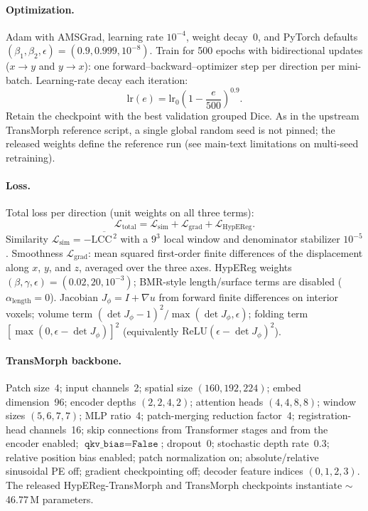 \documentclass[11pt,a4paper]{article}
\begin{document}
\paragraph{Optimization.}
Adam with AMSGrad, learning rate \(10^{-4}\), weight decay~0, and PyTorch defaults \((\beta_1,\beta_2,\epsilon)=(0.9,0.999,10^{-8})\). Train for 500 epochs with bidirectional updates (\(x\rightarrow y\) and \(y\rightarrow x\)): one forward--backward--optimizer step per direction per mini-batch. Learning-rate decay each iteration:
\[
\mathrm{lr}(e)=\mathrm{lr}_0\left(1-\frac{e}{500}\right)^{0.9}.
\]
Retain the checkpoint with the best validation grouped Dice. As in the upstream TransMorph reference script, a single global random seed is not pinned; the released weights define the reference run (see main-text limitations on multi-seed retraining).

\paragraph{Loss.}
Total loss per direction (unit weights on all three terms):
\[
\mathcal{L}_{\mathrm{total}}
=
\mathcal{L}_{\mathrm{sim}}
+
\mathcal{L}_{\mathrm{grad}}
+
\mathcal{L}_{\mathrm{HypEReg}}.
\]
Similarity \(\mathcal{L}_{\mathrm{sim}}=-\overline{\mathrm{LCC}^{\,2}}\) with a \(9^3\) local window and denominator stabilizer \(10^{-5}\). Smoothness \(\mathcal{L}_{\mathrm{grad}}\): mean squared first-order finite differences of the displacement along \(x\), \(y\), and \(z\), averaged over the three axes. HypEReg weights \((\beta,\gamma,\epsilon)=(0.02,20,10^{-3})\); BMR-style length/surface terms are disabled (\(\alpha_{\mathrm{length}}=0\)). Jacobian \(J_\phi=I+\nabla u\) from forward finite differences on interior voxels; volume term \((\det J_\phi-1)^2/\max(\det J_\phi,\epsilon)\); folding term \([\max(0,\epsilon-\det J_\phi)]^2\) (equivalently \(\mathrm{ReLU}(\epsilon-\det J_\phi)^2\)).

\paragraph{TransMorph backbone.}
Patch size~4; input channels~2; spatial size \((160,192,224)\); embed dimension~96; encoder depths \((2,2,4,2)\); attention heads \((4,4,8,8)\); window sizes \((5,6,7,7)\); MLP ratio~4; patch-merging reduction factor~4; registration-head channels~16; skip connections from Transformer stages and from the encoder enabled; \(\texttt{qkv\_bias}=\texttt{False}\); dropout~0; stochastic depth rate~0.3; relative position bias enabled; patch normalization on; absolute/relative sinusoidal PE off; gradient checkpointing off; decoder feature indices \((0,1,2,3)\). The released HypEReg-TransMorph and TransMorph checkpoints instantiate \(\sim\)46.77\,M parameters.
\end{document}
